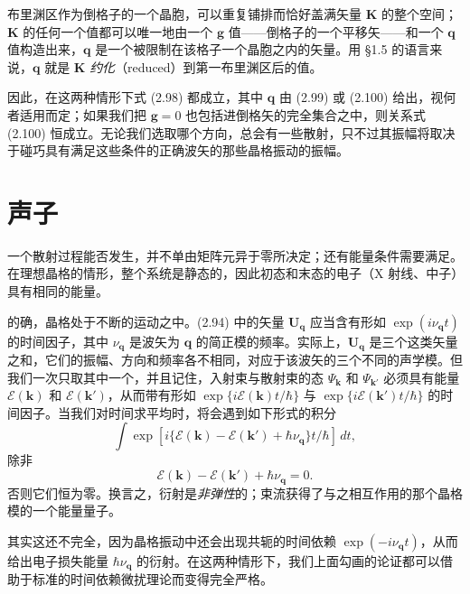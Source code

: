 布里渊区作为倒格子的一个晶胞，可以重复铺排而恰好盖满矢量 $\mathbf{K}$ 的整个空间；$\mathbf{K}$ 的任何一个值都可以唯一地由一个 $\mathbf{g}$ 值——倒格子的一个平移矢——和一个 $\mathbf{q}$ 值构造出来，$\mathbf{q}$ 是一个被限制在该格子一个晶胞之内的矢量。用 §1.5 的语言来说，$\mathbf{q}$ 就是 $\mathbf{K}$ \emph{约化}（reduced）到第一布里渊区后的值。

因此，在这两种情形下式 (2.98) 都成立，其中 $\mathbf{q}$ 由 (2.99) 或 (2.100) 给出，视何者适用而定；如果我们把 $\mathbf{g}=0$ 也包括进倒格矢的完全集合之中，则关系式 (2.100) 恒成立。无论我们选取哪个方向，总会有一些散射，只不过其振幅将取决于碰巧具有满足这些条件的正确波矢的那些晶格振动的振幅。

\section{声子}

一个散射过程能否发生，并不单由矩阵元异于零所决定；还有能量条件需要满足。在理想晶格的情形，整个系统是静态的，因此初态和末态的电子（X 射线、中子）具有相同的能量。

的确，晶格处于不断的运动之中。(2.94) 中的矢量 $\mathbf{U}_{\mathbf{q}}$ 应当含有形如 $\exp(i\nu_{\mathbf{q}}t)$ 的时间因子，其中 $\nu_{\mathbf{q}}$ 是波矢为 $\mathbf{q}$ 的简正模的频率。实际上，$\mathbf{U}_{\mathbf{q}}$ 是三个这类矢量之和，它们的振幅、方向和频率各不相同，对应于该波矢的三个不同的声学模。但我们一次只取其中一个，并且记住，入射束与散射束的态 $\Psi_{\mathbf{k}}$ 和 $\Psi_{\mathbf{k}'}$ 必须具有能量 $\mathcal{E}(\mathbf{k})$ 和 $\mathcal{E}(\mathbf{k}')$，从而带有形如 $\exp\{i\mathcal{E}(\mathbf{k})t/\hbar\}$ 与 $\exp\{i\mathcal{E}(\mathbf{k}')t/\hbar\}$ 的时间因子。当我们对时间求平均时，将会遇到如下形式的积分
\begin{equation*}
\int \exp[i\{\mathcal{E}(\mathbf{k})-\mathcal{E}(\mathbf{k}')+\hbar\nu_{\mathbf{q}}\}t/\hbar]\,dt,
\end{equation*}
除非
\begin{equation*}
\mathcal{E}(\mathbf{k})-\mathcal{E}(\mathbf{k}')+\hbar\nu_{\mathbf{q}}=0.
\tag{2.101}
\end{equation*}
否则它们恒为零。换言之，衍射是\emph{非弹性}的；束流获得了与之相互作用的那个晶格模的一个能量量子。

其实这还不完全，因为晶格振动中还会出现共轭的时间依赖 $\exp(-i\nu_{\mathbf{q}}t)$，从而给出电子损失能量 $\hbar\nu_{\mathbf{q}}$ 的衍射。在这两种情形下，我们上面勾画的论证都可以借助于标准的时间依赖微扰理论而变得完全严格。

